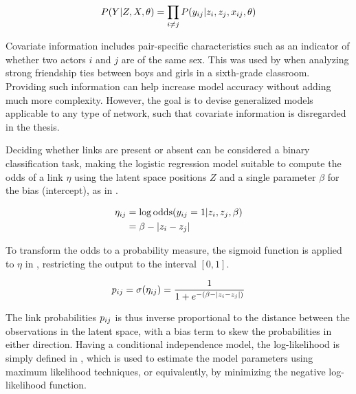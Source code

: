         \begin{equation}\label{eq:lsm-link-proba}
            P(Y|Z,X,\theta) = \prod_{i\neq j} P(\sub(y)|z_i,z_j,\sub(x),\theta)
        \end{equation}
        
        Covariate information includes pair-specific characteristics such as an indicator of whether two actors $i$ and $j$ are of the same sex. This was used by \citeauthor*{hoff2002latent} when analyzing strong friendship ties between boys and girls in a sixth-grade classroom. Providing such information can help increase model accuracy without adding much more complexity. However, the goal is to devise generalized models applicable to any type of network, such that covariate information is disregarded in the thesis. 
        
        Deciding whether links are present or absent can be considered a binary classification task, making the logistic regression model suitable to compute the odds of a link $\eta$ using the latent space positions $Z$ and a single parameter $\beta$ for the bias (intercept), as in .
        
        \begin{equation}\label{eq:lsm-link-odds}
            \begin{split}
                \sub(\eta) &= \log \odds(\sub(y)=1|z_i,z_j,\beta) \\
                           &= \beta - |z_i-z_j|
            \end{split}
        \end{equation}
        
        To transform the odds to a probability measure, the sigmoid function is applied to $\eta$ in , restricting the output to the interval $[0,1]$.
        
        \begin{equation}\label{eq:lsm-link-sigmoid}
            \sub(p) = \sigma(\sub(\eta)) = \frac{1}{1 + e^{-(\beta - |z_i-z_j|)}}
        \end{equation}
        
        The link probabilities $\sub(p)$ is thus inverse proportional to the distance between the observations in the latent space, with a bias term to skew the probabilities in either direction.
        Having a conditional independence model, the log-likelihood is simply defined in , which is used to estimate the model parameters using maximum likelihood techniques, or equivalently, by minimizing the negative log-likelihood function.
        
